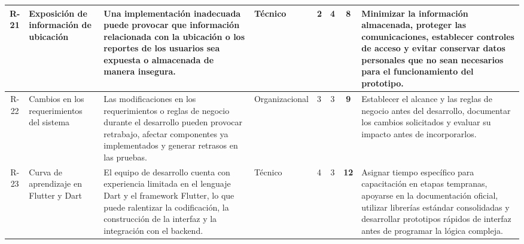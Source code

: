 \begin{landscape}
\begin{longtable}{|c|p{3cm}|p{5cm}|p{2cm}|p{1.1cm}|c|c|p{6cm}|}
R-21 & Exposición de información de ubicación & Una implementación inadecuada puede provocar que información relacionada con la ubicación o los reportes de los usuarios sea expuesta o almacenada de manera insegura. & Técnico & 2 & 4 & \cellcolor{riskYellow} \textbf{8} & Minimizar la información almacenada, proteger las comunicaciones, establecer controles de acceso y evitar conservar datos personales que no sean necesarios para el funcionamiento del prototipo. \\ \hline

R-22 & Cambios en los requerimientos del sistema & Las modificaciones en los requerimientos o reglas de negocio durante el desarrollo pueden provocar retrabajo, afectar componentes ya implementados y generar retrasos en las pruebas. & Organiza\-cional & 3 & 3 & \cellcolor{riskYellow} \textbf{9} & Establecer el alcance y las reglas de negocio antes del desarrollo, documentar los cambios solicitados y evaluar su impacto antes de incorporarlos. \\ \hline

R-23 & Curva de aprendizaje en Flutter y Dart & El equipo de desarrollo cuenta con experiencia limitada en el lenguaje Dart y el framework Flutter, lo que puede ralentizar la codificación, la construcción de la interfaz y la integración con el backend. & Técnico & 4 & 3 & \cellcolor{riskOrange} \textbf{12} & Asignar tiempo específico para capacitación en etapas tempranas, apoyarse en la documentación oficial, utilizar librerías estándar consolidadas y desarrollar prototipos rápidos de interfaz antes de programar la lógica compleja. \\ \hline

\end{longtable}
\end{landscape}